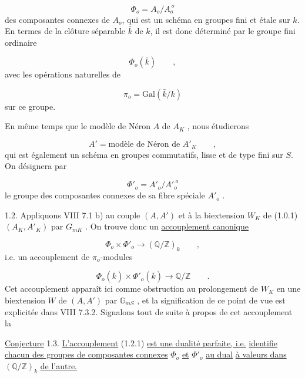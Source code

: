 \begin{equation}\tag{1.1.5}
\Phi_o = A_o/A_o^{\ o}
\end{equation}
des composantes connexes de $A_o$, qui est un schéma en groupes fini et étale sur $k$. En termes de la clôture séparable $\bar{k}$ de $k$, il est donc déterminé par le groupe fini ordinaire

\begin{equation}\tag{1.1.6}
\Phi_o(\bar{k}) \qquad ,
\end{equation}
avec les opérations naturelles de

\begin{equation*}
\pi_o = \mathrm{Gal}(\bar{k}/k)
\end{equation*}
sur ce groupe.

En même temps que le modèle de Néron $A$ de $A_K$ , nous étudierons

\begin{equation}\tag{1.1.7}
A' = \text{modèle de Néron de } A'_K \qquad ,
\end{equation}
qui est également un schéma en groupes commutatifs, lisse et de type fini sur $S$. On désignera par

\begin{equation}\tag{1.1.8}
\Phi'_o = A'_o/{A'}_o^{\ o}
\end{equation}
le groupe des composantes connexes de sa fibre spéciale $A'_o$ .



1.2. Appliquons VIII 7.1 b) au couple $(A,A')$ et à la biextension $W_K$ de (1.0.1) $(A_K,A'_K)$ par $G_{mK}$ . On trouve donc un \underline{accouplement canonique}

\begin{equation}\tag{1.2.1}
\Phi_o \times \Phi'_o \longrightarrow (\mathbb{Q}/\mathbb{Z})_k \qquad ,
\end{equation}
i.e. un accouplement de $\pi_o$-modules

\begin{equation}\tag{1.2.2}
\Phi_o(\overline{k}) \times \Phi'_o(\overline{k}) \longrightarrow \mathbb{Q}/\mathbb{Z} \qquad .
\end{equation}
Cet accouplement apparaît ici comme obstruction au prolongement de $W_K$ en une biextension $W$ de $(A,A')$ par $\mathbb{G}_{mS}$ , et la signification de ce point de vue est explicitée dans VIII 7.3.2. Signalons tout de suite à propos de cet accouplement la

\underline{Conjecture} 1.3. \underline{L'accouplement} (1.2.1) \underline{est une dualité parfaite, i.e.} \underline{identifie chacun des groupes de composantes connexes} $\Phi_o$ \underline{et} $\Phi'_o$ \underline{au dual} \underline{à valeurs dans} $(\mathbb{Q}/\mathbb{Z})_k$ \underline{de l'autre.}

